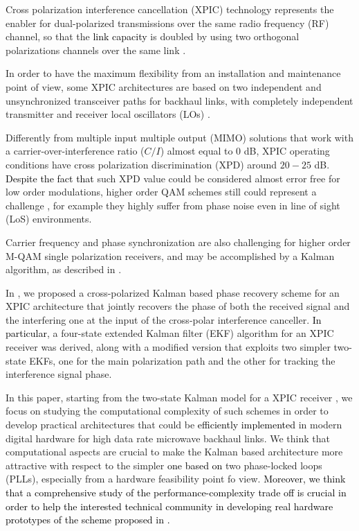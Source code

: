 Cross polarization interference cancellation (XPIC) technology represents the enabler for dual-polarized transmissions over the same radio frequency (RF) channel, so that the \textcolor{black}{link capacity} is doubled by using two orthogonal polarizations channels over the same link \cite{Noel}. 

In order to have the maximum flexibility from an installation and maintenance point of view, some XPIC architectures are based on two independent and unsynchronized transceiver paths for backhaul links, with completely independent transmitter and receiver local oscillators (LOs) \cite{Rossi}.

Differently from multiple input multiple output (MIMO) solutions that work with a carrier-over-interference ratio ($C/I$) almost equal to $0$ dB, XPIC operating conditions have cross polarization discrimination (XPD) around $20-25$ dB. \textcolor{black}{Despite the fact that} such XPD value could be considered almost error free for low order modulations, higher order QAM schemes still could represent a challenge \cite{Noel2}\cite{Proenca}, for example they highly suffer from phase noise even in line of sight (LoS) environments.

Carrier frequency and phase synchronization are also challenging for higher order M-QAM single polarization receivers, and may be accomplished by a Kalman algorithm, as described in \cite{Campeanu}\cite{Wei-Tsen}.

In \cite{CommLett}, we proposed a cross-polarized Kalman based phase recovery scheme for an XPIC architecture that jointly recovers the phase of both the received signal and the interfering one at the input of the cross-polar interference canceller. \textcolor{black}{In particular}, a four-state extended Kalman filter (EKF) algorithm for an XPIC receiver was derived, along with a modified version that exploits two simpler two-state EKFs, one for the main polarization path and the other for tracking the interference signal phase.


In this paper, starting from the two-state Kalman model for a XPIC receiver \cite{CommLett}, we focus on studying the computational complexity of such schemes in order to develop practical architectures that could be \textcolor{black}{efficiently implemented} in modern digital hardware for high data rate microwave backhaul links. We think that computational aspects are crucial to make the Kalman based architecture more attractive with respect to the simpler \textcolor{black}{one based on} two phase-locked loops (PLLs), especially from a hardware feasibility point fo view. \textcolor{black}{Moreover, we think that a comprehensive study of the performance-complexity trade off is crucial in order to help the interested technical community in developing real hardware prototypes of the scheme proposed in \cite{CommLett}.}



